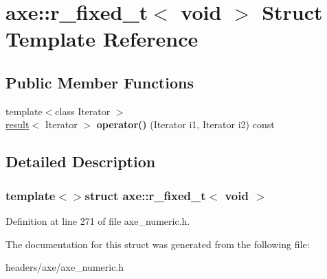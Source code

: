 \hypertarget{structaxe_1_1r__fixed__t_3_01void_01_4}{\section{axe\+:\+:r\+\_\+fixed\+\_\+t$<$ void $>$ Struct Template Reference}
\label{structaxe_1_1r__fixed__t_3_01void_01_4}
}
\subsection*{Public Member Functions}
\begin{DoxyCompactItemize}
\item 
\hypertarget{structaxe_1_1r__fixed__t_3_01void_01_4_aa62c9567d77411df07b9d8639d0ce6d8}{{\footnotesize template$<$class Iterator $>$ }\\\hyperlink{structaxe_1_1result}{result}$<$ Iterator $>$ {\bfseries operator()} (Iterator i1, Iterator i2) const }\label{structaxe_1_1r__fixed__t_3_01void_01_4_aa62c9567d77411df07b9d8639d0ce6d8}

\end{DoxyCompactItemize}


\subsection{Detailed Description}
\subsubsection*{template$<$$>$struct axe\+::r\+\_\+fixed\+\_\+t$<$ void $>$}



Definition at line 271 of file axe\+\_\+numeric.\+h.



The documentation for this struct was generated from the following file\+:\begin{DoxyCompactItemize}
\item 
headers/axe/axe\+\_\+numeric.\+h\end{DoxyCompactItemize}
